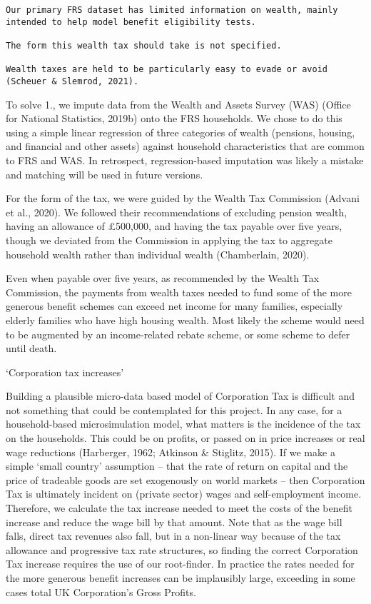 \documentclass[
  letterpaper,
  DIV=11,
  numbers=noendperiod]{scrartcl}
\begin{document}
\begin{verbatim}
Our primary FRS dataset has limited information on wealth, mainly intended to help model benefit eligibility tests. 

The form this wealth tax should take is not specified. 

Wealth taxes are held to be particularly easy to evade or avoid (Scheuer & Slemrod, 2021). 
\end{verbatim}

To solve 1., we impute data from the Wealth and Assets Survey (WAS)
(Office for National Statistics, 2019b) onto the FRS households. We
chose to do this using a simple linear regression of three categories of
wealth (pensions, housing, and financial and other assets) against
household characteristics that are common to FRS and WAS. In retrospect,
regression-based imputation was likely a mistake and matching will be
used in future versions.

For the form of the tax, we were guided by the Wealth Tax Commission
(Advani et al., 2020). We followed their recommendations of excluding
pension wealth, having an allowance of £500,000, and having the tax
payable over five years, though we deviated from the Commission in
applying the tax to aggregate household wealth rather than individual
wealth (Chamberlain, 2020).

Even when payable over five years, as recommended by the Wealth Tax
Commission, the payments from wealth taxes needed to fund some of the
more generous benefit schemes can exceed net income for many families,
especially elderly families who have high housing wealth. Most likely
the scheme would need to be augmented by an income-related rebate
scheme, or some scheme to defer until death.

`Corporation tax increases'

Building a plausible micro-data based model of Corporation Tax is
difficult and not something that could be contemplated for this project.
In any case, for a household-based microsimulation model, what matters
is the incidence of the tax on the households. This could be on profits,
or passed on in price increases or real wage reductions (Harberger,
1962; Atkinson \& Stiglitz, 2015). If we make a simple `small country'
assumption -- that the rate of return on capital and the price of
tradeable goods are set exogenously on world markets -- then Corporation
Tax is ultimately incident on (private sector) wages and self-employment
income. Therefore, we calculate the tax increase needed to meet the
costs of the benefit increase and reduce the wage bill by that amount.
Note that as the wage bill falls, direct tax revenues also fall, but in
a non-linear way because of the tax allowance and progressive tax rate
structures, so finding the correct Corporation Tax increase requires the
use of our root-finder. In practice the rates needed for the more
generous benefit increases can be implausibly large, exceeding in some
cases total UK Corporation's Gross Profits.
\end{document}
